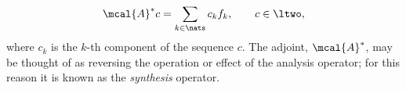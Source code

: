 \documentclass[a4paper, 12pt]{article}
\newcommand{\sumn}{\ensuremath{\sum_{k \in \nats}}\xspace}
\begin{document}
\begin{align}
  \mcal{A}^* c = \sum_{k \in \nats} c_k f_k, \qquad  c \in \ltwo,\notag
  \label{}
\end{align}
where $c_k$ is the $k$-th component of the sequence $c$. The adjoint, $\mcal{A}^*$, may be thought of as reversing the operation or effect of the analysis operator; for this reason it is known as the \emph{synthesis} operator.
\begin{comment}
By composing the analysis and the synthesis operators, we obtain the \emph{frame operator} $F:\LtwoR \to \LtwoR$ defined as: 
\begin{align}
  \mcal{F} f := \mcal{A}\mcal{A}^*f = \sum_{k \in \nats} \langle f, f_k \rangle f_k, \notag
\end{align}
for all $f \in \LtwoR$.
The frame operator $F$ is bounded, invertible, and self-adjoint\footnote{See \cite{Christensen2001} and the references therein.}. This yields the representation result
\begin{align}
  f = FF^{-1}f = \sumn \langle f, F^{-1} f_k\rangle f_k. \notag 
  \label{}
\end{align}
The sequence $\{F^{-1}f_k\}_{k \in \nats}$ is also a frame, and it is called the \emph{canonical dual} of $\{f_k\}_{k \in \nats}$. A frame will generally have other duals besides the canonical dual. That is, there exists  sequences $\{\tilde{f}_k\}_{k \in \nats}$ besides the canonical sequence such that 
\begin{align}
  f = \sumn \langle f, \tilde{f}_k\rangle f_k \qquad  f \in \LtwoR.
  \label{eq:dual}
\end{align}
\end{comment}
\end{document}
